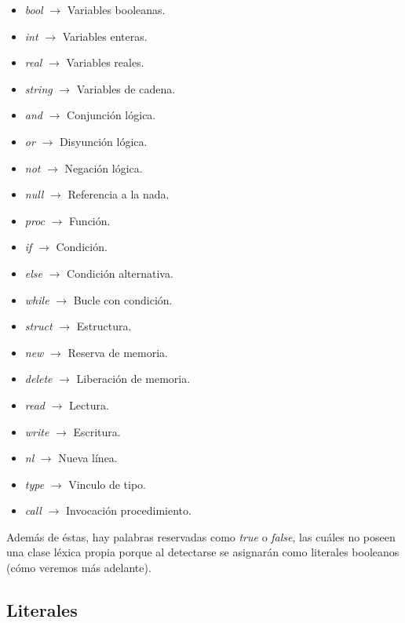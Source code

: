 \begin{itemize}
    \item \textit{bool} $\rightarrow$ Variables booleanas.
    \item \textit{int} $\rightarrow$ Variables enteras.
    \item \textit{real} $\rightarrow$ Variables reales.
    \item \textit{string} $\rightarrow$ Variables de cadena.
    \item \textit{and} $\rightarrow$ Conjunción lógica.
    \item \textit{or} $\rightarrow$ Disyunción lógica.
    \item \textit{not} $\rightarrow$ Negación lógica.
    \item \textit{null} $\rightarrow$ Referencia a la nada.
    \item \textit{proc} $\rightarrow$ Función.
    \item \textit{if} $\rightarrow$ Condición.
    \item \textit{else} $\rightarrow$ Condición alternativa.
    \item \textit{while} $\rightarrow$ Bucle con condición.
    \item \textit{struct} $\rightarrow$ Estructura.
    \item \textit{new} $\rightarrow$ Reserva de memoria.
    \item \textit{delete} $\rightarrow$ Liberación de memoria.
    \item \textit{read} $\rightarrow$ Lectura.
    \item \textit{write} $\rightarrow$ Escritura.
    \item \textit{nl} $\rightarrow$ Nueva línea.
    \item \textit{type} $\rightarrow$ Vinculo de tipo.
    \item \textit{call} $\rightarrow$ Invocación procedimiento.
\end{itemize}

Además de éstas, hay palabras reservadas como \textit{true} o \textit{false}, las cuáles no poseen una clase léxica propia
porque al detectarse se asignarán como literales booleanos (cómo veremos más adelante).

\subsection{Literales}

